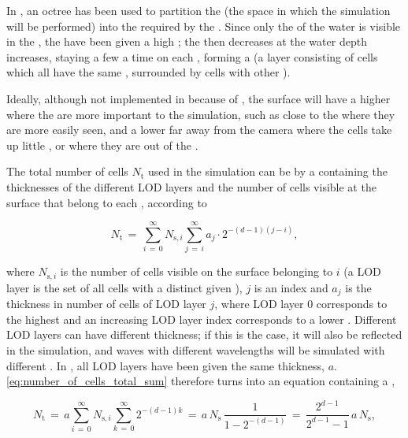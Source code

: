 In \thisprojectwork, an octree has been used to partition the  (the space in which the simulation will be performed) into the \cells required by the \FVM. Since only the \surface of the water is visible in the \simulation, the  have been given a high \LOD; the \LOD then decreases at the water depth increases, staying a few  a time on each \LOD, forming a  (a layer consisting of cells which all have the same \LOD, surrounded by cells with other \LODs).

Ideally, although not implemented in \thisprojectwork because of \itslimitedtime, the surface will have a higher \LOD where the  are more important to the simulation, such as close to the \camera where they are more easily seen, and a lower \LOD far away from the camera where the cells take up little , or where they are out of the \FOV.

The total number of cells $N_{\text{t}}$ used in the simulation can be \approximated by a  containing the thicknesses of the different LOD layers and the number of cells visible at the surface that belong to each \LOD, according to

\begin{equation} \label{eq:number_of_cells_total_sum}
N_{\text{t}} \,=\, \sum_{i\,=\,0}^\infty N_{\text{s},i}\sum_{j\,=\,i}^\infty a_j\cdot 2^{-(d-1)(j-i)},
\end{equation}

where $N_{\text{s},i}$ is the number of cells visible on the surface belonging to  $i$ (a LOD layer is the set of all cells with a distinct given \LOD), $j$ is an index and $a_j$ is the thickness in number of cells of LOD layer $j$, where LOD layer $0$ corresponds to the highest \LOD and an increasing LOD layer index corresponds to a lower \LOD. Different LOD layers can have different thickness; if this is the case, it will also be reflected in the simulation, and waves with different wavelengths will be simulated with different \accuracy. In \thisprojectwork, all LOD layers have been given the same thickness, $a$. \eqref{eq:number_of_cells_total_sum} therefore turns into an equation containing a ,

\begin{equation} \label{eq:number_of_cells_total}
N_{\text{t}} \,=\, a\sum_{i\,=\,0}^\infty N_{\text{s},i}\sum_{k\,=\,0}^\infty 2^{-(d-1)k} \,=\, a\,N_{\text{s}}\,\frac{1}{1-2^{-(d-1)}} \,=\, \frac{2^{d-1}}{2^{d-1}-1}\,a\,N_{\text{s}},
\end{equation}

